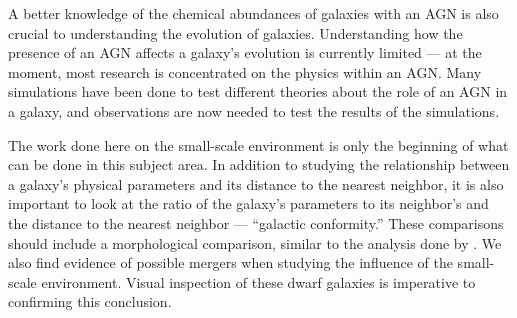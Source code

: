 A better knowledge of the chemical abundances of galaxies with an AGN is also 
crucial to understanding the evolution of galaxies.  Understanding how the 
presence of an AGN affects a galaxy's evolution is currently limited --- at the 
moment, most research is concentrated on the physics within an AGN.  Many 
simulations have been done to test different theories about the role of an AGN 
in a galaxy, and observations are now needed to test the results of the 
simulations.


The work done here on the small-scale environment is only the beginning of what 
can be done in this subject area.  In addition to studying the relationship 
between a galaxy's physical parameters and its distance to the nearest neighbor, 
it is also important to look at the ratio of the galaxy's parameters to its 
neighbor's and the distance to the nearest neighbor --- ``galactic 
conformity.''  These comparisons should include a morphological comparison, 
similar to the analysis done by \cite{Park09}.  We also find evidence of 
possible mergers when studying the influence of the small-scale environment.  
Visual inspection of these dwarf galaxies is imperative to confirming this 
conclusion.